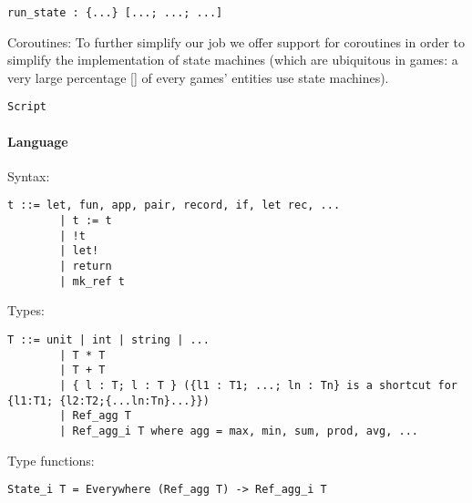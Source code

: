 \begin{lstlisting}
run_state : {...} [...; ...; ...]
\end{lstlisting}


Coroutines:
To further simplify our job we offer support for coroutines in order to simplify the implementation of state machines (which are ubiquitous in games: a very large percentage [] of every games' entities use state machines).

\begin{lstlisting}
Script
\end{lstlisting}


\paragraph{Language}

Syntax:

\begin{lstlisting}
t ::= let, fun, app, pair, record, if, let rec, ...
        | t := t
        | !t
        | let!
        | return
        | mk_ref t
\end{lstlisting}


Types:

\begin{lstlisting}
T ::= unit | int | string | ...
        | T * T
        | T + T
        | { l : T; l : T } ({l1 : T1; ...; ln : Tn} is a shortcut for {l1:T1; {l2:T2;{...ln:Tn}...}})
        | Ref_agg T
        | Ref_agg_i T where agg = max, min, sum, prod, avg, ...
\end{lstlisting}


Type functions:

\begin{lstlisting}
State_i T = Everywhere (Ref_agg T) -> Ref_agg_i T 
\end{lstlisting}
